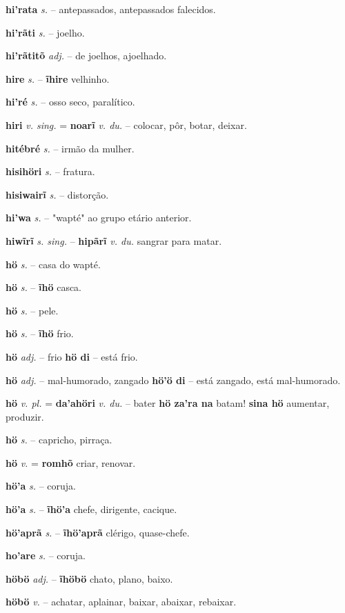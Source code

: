 \textbf{hi'rata} \textit{s.} -- antepassados, antepassados falecidos.

\textbf{hi'rãti} \textit{s.} -- joelho.

\textbf{hi'rãtitõ} \textit{adj.} -- de joelhos, ajoelhado.

\textbf{hire} \textit{s.} -- \textbf{ĩhire} velhinho.

\textbf{hi'ré} \textit{s.} -- osso seco, paralítico.

\textbf{hiri} \textit{v. sing.} = \textbf{noarĩ} \textit{v. du.} -- colocar, pôr, botar, deixar.

\textbf{hitébré} \textit{s.} -- irmão da mulher.

\textbf{hisihöri} \textit{s.} -- fratura.

\textbf{hisiwairĩ} \textit{s.} -- distorção.

\textbf{hi'wa} \textit{s.} -- "wapté" ao grupo etário anterior.

\textbf{hiwĩrĩ} \textit{s. sing.} -- \textbf{hipãrĩ} \textit{v. du.} sangrar para matar.

\textbf{hö} \textit{s.} -- casa do wapté.

\textbf{hö} \textit{s.} -- \textbf{ĩhö} casca.

\textbf{hö} \textit{s.} -- pele.

\textbf{hö} \textit{s.} -- \textbf{ĩhö} frio.

\textbf{hö} \textit{adj.} -- frio  \textbf{hö di} -- está frio.

\textbf{hö} \textit{adj.} -- mal-humorado, zangado  \textbf{hö'ö di} -- está zangado, está mal-humorado.

\textbf{hö} \textit{v. pl.} = \textbf{da'ahöri} \textit{v. du.} -- bater  \textbf{hö za'ra na} batam! \textbf{sina hö} aumentar, produzir.

\textbf{hö} \textit{s.} -- capricho, pirraça.

\textbf{hö} \textit{v.} = \textbf{romhõ} criar, renovar.

\textbf{hö'a} \textit{s.} -- coruja.

\textbf{hö'a} \textit{s.} -- \textbf{ĩhö'a} chefe, dirigente, cacique.

\textbf{hö'aprã} \textit{s.} -- \textbf{ĩhö'aprã} clérigo, quase-chefe.

\textbf{ho'are} \textit{s.} -- coruja.

\textbf{höbö} \textit{adj.} -- \textbf{ĩhöbö} chato, plano, baixo.

\textbf{höbö} \textit{v.} -- achatar, aplainar, baixar, abaixar, rebaixar.

